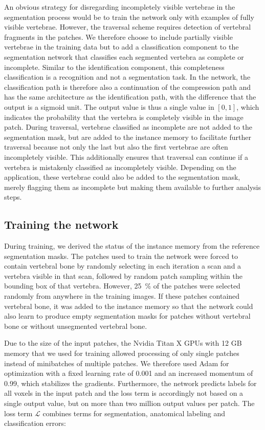\documentclass[authoryear,5p,final,times]{elsarticle}
\begin{document}
    An obvious strategy for disregarding incompletely visible vertebrae in the segmentation process would be to train the network only with examples of fully visible vertebrae. However, the traversal scheme requires detection of vertebral fragments in the patches. We therefore choose to include partially visible vertebrae in the training data but to add a classification component to the segmentation network that classifies each segmented vertebra as complete or incomplete. Similar to the identification component, this completeness classification is a recognition and not a segmentation task. In the network, the classification path is therefore also a continuation of the compression path and has the same architecture as the identification path, with the difference that the output is a sigmoid unit. The output value is thus a single value in $[0,1]$, which indicates the probability that the vertebra is completely visible in the image patch. During traversal, vertebrae classified as incomplete are not added to the segmentation mask, but are added to the instance memory to facilitate further traversal because not only the last but also the first vertebrae are often incompletely visible. This additionally ensures that traversal can continue if a vertebra is mistakenly classified as incompletely visible. Depending on the application, these vertebrae could also be added to the segmentation mask, merely flagging them as incomplete but making them available to further analysis steps.

    \subsection{Training the network}
    \label{sec:method_training}

    During training, we derived the status of the instance memory from the reference segmentation masks. The patches used to train the network were forced to contain vertebral bone by randomly selecting in each iteration a scan and a vertebra visible in that scan, followed by random patch sampling within the bounding box of that vertebra. However, \SI{25}{\percent} of the patches were selected randomly from anywhere in the training images. If these patches contained vertebral bone, it was added to the instance memory so that the network could also learn to produce empty segmentation masks for patches without vertebral bone or without unsegmented vertebral bone.

    Due to the size of the input patches, the Nvidia Titan X GPUs with 12 GB memory that we used for training allowed processing of only single patches instead of minibatches of multiple patches. We therefore used Adam \citep{Kingma2014} for optimization with a fixed learning rate of \num{0.001} and an increased momentum of \num{0.99}, which stabilizes the gradients. Furthermore, the network predicts labels for all voxels in the input patch and the loss term is accordingly not based on a single output value, but on more than two million output values per patch. The loss term $\mathcal{L}$ combines terms for segmentation, anatomical labeling and classification errors:
\end{document}
